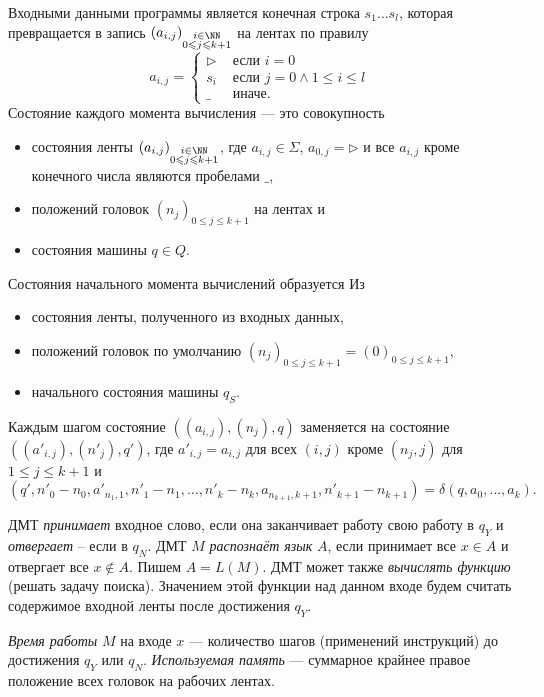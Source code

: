 \documentclass[12pt,a4paper]{article}
\begin{document}
\begin{definition}
        Входными данными программы является конечная строка $s_1 \dots s_l$, которая превращается в запись $(a_{i, j})_{\substack{i \in \NN\\ 0 \leqslant j \leqslant k + 1}}$ на лентах по правилу
        \[
            a_{i, j} = 
            \begin{cases}
                \triangleright& \text{ если } i = 0\\
                s_i& \text{ если } j = 0 \wedge 1 \leqslant i \leqslant l\\
                \_ & \text{ иначе.}
            \end{cases}
        \]
        Состояние каждого момента вычисления --- это совокупность
        \begin{itemize}
            \item состояния ленты $(a_{i, j})_{\substack{i \in \NN\\ 0 \leqslant j \leqslant k + 1}}$, где $a_{i, j} \in \Sigma$, $a_{0, j} = \triangleright$ и все $a_{i, j}$ кроме конечного числа являются пробелами $\_$,
            \item положений головок $(n_j)_{0 \leqslant j \leqslant k + 1}$ на лентах и
            \item состояния машины $q \in Q$.
        \end{itemize}
        Состояния начального момента вычислений образуется Из
        \begin{itemize}
            \item состояния ленты, полученного из входных данных,
            \item положений головок по умолчанию $(n_j)_{0 \leqslant j \leqslant k + 1} = (0)_{0 \leqslant j \leqslant k + 1}$,
            \item начального состояния машины $q_S$.
        \end{itemize}
        Каждым шагом состояние $((a_{i, j}), (n_j), q)$ заменяется на состояние $((a'_{i, j}), (n'_j), q')$, где $a'_{i,j} = a_{i,j}$ для всех $(i, j)$ кроме $(n_j, j)$ для $1 \leqslant j \leqslant k+1$ и
        \[
            (q', n'_0 - n_0, a'_{n_1, 1}, n'_1 - n_1, \dots, n'_k - n_k, a_{n_{k+1}, k+1}, n'_{k+1} - n_{k+1}) = \delta(q, a_0, \dots, a_k).
        \]
    \end{definition}

    \begin{definition}
        ДМТ \emph{принимает} входное слово, если она заканчивает работу свою работу в $q_Y$ и \emph{отвергает} -- если в $q_N$. ДМТ $M$ \emph{распознаёт язык} $A$, если принимает все $x \in A$ и отвергает все $x \notin A$. Пишем $A = L(M)$. ДМТ может также \emph{вычислять функцию} (решать задачу поиска). Значением этой функции над данном входе будем считать содержимое входной ленты после достижения $q_Y$.

        \emph{Время работы} $M$ на входе $x$ --- количество шагов (применений инструкций) до достижения $q_Y$ или $q_N$. \emph{Используемая память} --- суммарное крайнее правое положение всех головок на рабочих лентах.
    \end{definition}
\end{document}
